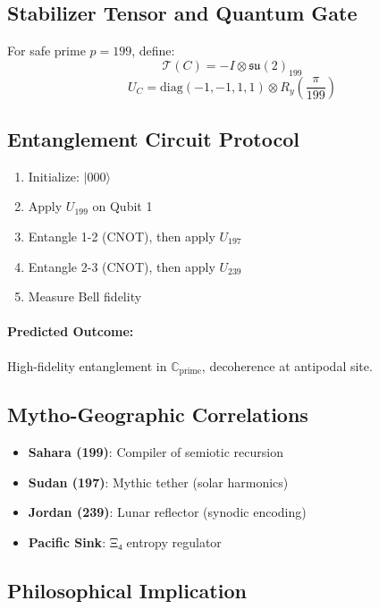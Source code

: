 \documentclass[12]{amsart}
\theoremstyle{plain}
\begin{document}
\subsection{Stabilizer Tensor and Quantum Gate}

For safe prime $p=199$, define:
\[
\mathcal{T}(C) = -I \otimes \mathfrak{su}(2)_{199}
\]
\[
U_C = \mathrm{diag}(-1,-1,1,1) \otimes R_y\left( \frac{\pi}{199} \right)
\]

\subsection{Entanglement Circuit Protocol}

\begin{enumerate}
    \item Initialize: $|000\rangle$
    \item Apply $U_{199}$ on Qubit 1
    \item Entangle 1-2 (CNOT), then apply $U_{197}$
    \item Entangle 2-3 (CNOT), then apply $U_{239}$
    \item Measure Bell fidelity
\end{enumerate}

\paragraph{Predicted Outcome:} High-fidelity entanglement in $\mathbb{C}_{\text{prime}}$, decoherence at antipodal site.

\subsection{Mytho-Geographic Correlations}

\begin{itemize}
    \item \textbf{Sahara (199)}: Compiler of semiotic recursion
    \item \textbf{Sudan (197)}: Mythic tether (solar harmonics)
    \item \textbf{Jordan (239)}: Lunar reflector (synodic encoding)
    \item \textbf{Pacific Sink}: Ξ₄ entropy regulator
\end{itemize}

\subsection{Philosophical Implication}
\end{document}
